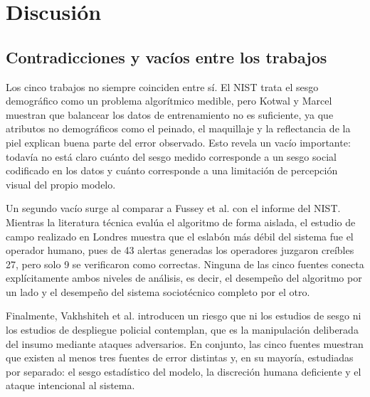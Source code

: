%
\section{Discusión}
\label{sec:discusion}

\subsection{Contradicciones y vacíos entre los trabajos}

Los cinco trabajos no siempre coinciden entre sí. El NIST
\cite{grother_nistir8280_2019} trata el sesgo demográfico como un
problema algorítmico medible, pero Kotwal y Marcel
\cite{kotwal_fairness_2026} muestran que balancear los datos de
entrenamiento no es suficiente, ya que atributos no demográficos como
el peinado, el maquillaje y la reflectancia de la piel explican buena
parte del error observado. Esto revela un vacío importante: todavía
no está claro cuánto del sesgo medido corresponde a un sesgo social
codificado en los datos y cuánto corresponde a una limitación de
percepción visual del propio modelo.

Un segundo vacío surge al comparar a Fussey et al.
\cite{fussey_assisted_2020} con el informe del NIST. Mientras la
literatura técnica evalúa el algoritmo de forma aislada, el estudio de
campo realizado en Londres muestra que el eslabón más débil del
sistema fue el operador humano, pues de 43 alertas generadas los
operadores juzgaron creíbles 27, pero solo 9 se verificaron como
correctas. Ninguna de las cinco fuentes conecta explícitamente ambos
niveles de análisis, es decir, el desempeño del algoritmo por un lado
y el desempeño del sistema sociotécnico completo por el otro.

Finalmente, Vakhshiteh et al. \cite{vakhshiteh_adversarial_2021}
introducen un riesgo que ni los estudios de sesgo ni los estudios de
despliegue policial contemplan, que es la manipulación deliberada del
insumo mediante ataques adversarios. En conjunto, las cinco fuentes
muestran que existen al menos tres fuentes de error distintas y, en su
mayoría, estudiadas por separado: el sesgo estadístico del modelo, la
discreción humana deficiente y el ataque intencional al sistema.

